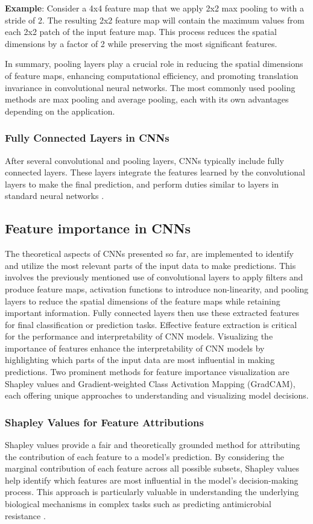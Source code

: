 \documentclass[english,11pt,a4paper,titlepage]{article}
\begin{document}
	\textbf{Example}: Consider a 4x4 feature map that we apply 2x2 max pooling to with a stride of 2. The resulting 2x2 feature map will contain the maximum values from each 2x2 patch of the input feature map. This process reduces the spatial dimensions by a factor of 2 while preserving the most significant features.
	
	In summary, pooling layers play a crucial role in reducing the spatial dimensions of feature maps, enhancing computational efficiency, and promoting translation invariance in convolutional neural networks. The most commonly used pooling methods are max pooling and average pooling, each with its own advantages depending on the application.
	
	\subsubsection*{Fully Connected Layers in CNNs}
	After several convolutional and pooling layers, CNNs typically include fully connected layers. These layers integrate the features learned by the convolutional layers to make the final prediction, and perform duties similar to layers in standard neural networks \cite{osheaIntroductionConvolutionalNeural2015}.
	
	\subsection*{Feature importance in CNNs}
	The theoretical aspects of CNNs presented so far, are implemented to identify and utilize the most relevant parts of the input data to make predictions. This involves the previously mentioned use of convolutional layers to apply filters and produce feature maps, activation functions to introduce non-linearity, and pooling layers to reduce the spatial dimensions of the feature maps while retaining important information. Fully connected layers then use these extracted features for final classification or prediction tasks. Effective feature extraction is critical for the performance and interpretability of CNN models. Visualizing the importance of features enhance the interpretability of CNN models by highlighting which parts of the input data are most influential in making predictions. Two prominent methods for feature importance visualization are Shapley values and Gradient-weighted Class Activation Mapping (GradCAM), each offering unique approaches to understanding and visualizing model decisions.
	
	\subsubsection*{Shapley Values for Feature Attributions}
	Shapley values provide a fair and theoretically grounded method for attributing the contribution of each feature to a model's prediction. By considering the marginal contribution of each feature across all possible subsets, Shapley values help identify which features are most influential in the model's decision-making process. This approach is particularly valuable in understanding the underlying biological mechanisms in complex tasks such as predicting antimicrobial resistance \cite{wrobelEfficientExplanationIndividual}.
	
\end{document}
